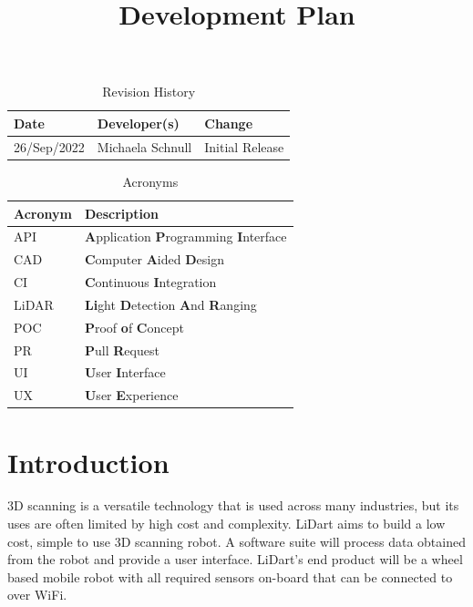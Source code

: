 \documentclass[titlepage]{article}
\title{Development Plan\\\progname}
\author{\authname}
\date{}
\begin{document}
\maketitle

\newpage

\begin{table}[hp]
\caption{Revision History} \label{TblRevisionHistory}
\begin{tabularx}{\textwidth}{llX}
\toprule
\textbf{Date} & \textbf{Developer(s)} & \textbf{Change}\\
\midrule
26/Sep/2022 & Michaela Schnull & Initial Release\\
\bottomrule
\end{tabularx}
\end{table}

\begin{table}[hp]
\caption{Acronyms} \label{Acronyms}
\begin{tabularx}{\textwidth}{lX}
\toprule
\textbf{Acronym} & \textbf{Description} \\
\midrule
API & \textbf{A}pplication \textbf{P}rogramming \textbf{I}nterface \\
CAD & \textbf{C}omputer \textbf{A}ided \textbf{D}esign\\
CI & \textbf{C}ontinuous \textbf{I}ntegration\\
LiDAR & \textbf{Li}ght \textbf{D}etection \textbf{A}nd \textbf{R}anging\\
POC & \textbf{P}roof \textbf{o}f \textbf{C}oncept\\
PR & \textbf{P}ull \textbf{R}equest\\
UI & \textbf{U}ser \textbf{I}nterface\\
UX & \textbf{U}ser \textbf{E}xperience\\
\bottomrule
\end{tabularx}
\end{table}

\newpage

\section{Introduction}

3D scanning is a versatile technology that is used across many industries, but its uses are often limited by high cost and complexity. LiDart aims to build a low cost, simple to use 3D scanning robot. A software suite will process data obtained from the robot and provide a user interface. LiDart's end product will be a wheel based mobile robot with all required sensors on-board that can be connected to over WiFi.
\end{document}
